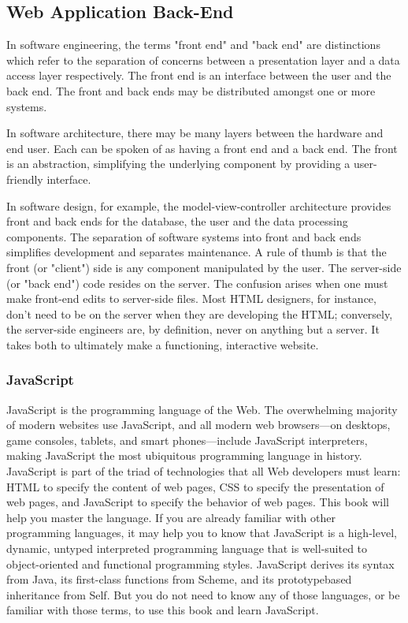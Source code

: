 \subsection{Web Application Back-End}
In software engineering, the terms "front end" and "back end" are distinctions which refer to the separation of concerns between a presentation layer and a data access layer respectively.
The front end is an interface between the user and the back end. The front and back ends may be distributed amongst one or more systems.

In software architecture, there may be many layers between the hardware and end user. Each can be spoken of as having a front end and a back end. The front is an abstraction, simplifying the underlying component by providing a user-friendly interface.

In software design, for example, the model-view-controller architecture provides front and back ends for the database, the user and the data processing components. The separation of software systems into front and back ends simplifies development and separates maintenance. A rule of thumb is that the front (or "client") side is any component manipulated by the user. The server-side (or "back end") code resides on the server. The confusion arises when one must make front-end edits to server-side files. Most HTML designers, for instance, don't need to be on the server when they are developing the HTML; conversely, the server-side engineers are, by definition, never on anything but a server. It takes both to ultimately make a functioning, interactive website.
\subsubsection{JavaScript}
JavaScript is the programming language of the Web. The overwhelming majority of
modern websites use JavaScript, and all modern web browsers—on desktops, game
consoles, tablets, and smart phones—include JavaScript interpreters, making JavaScript
the most ubiquitous programming language in history. JavaScript is part of the
triad of technologies that all Web developers must learn: HTML to specify the content
of web pages, CSS to specify the presentation of web pages, and JavaScript to specify
the behavior of web pages. This book will help you master the language.
If you are already familiar with other programming languages, it may help you to know
that JavaScript is a high-level, dynamic, untyped interpreted programming language
that is well-suited to object-oriented and functional programming styles. JavaScript
derives its syntax from Java, its first-class functions from Scheme, and its prototypebased
inheritance from Self. But you do not need to know any of those languages, or
be familiar with those terms, to use this book and learn JavaScript.

